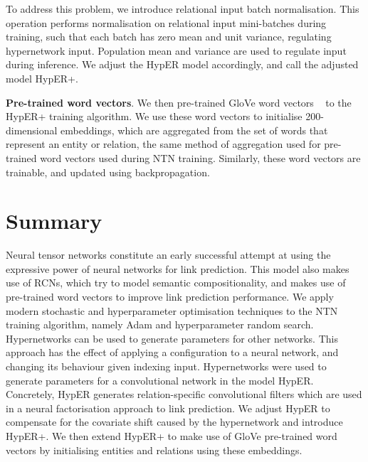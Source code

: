 \noindent To address this problem, we introduce relational input batch normalisation. This operation performs normalisation on relational input mini-batches during training, such that each batch has zero mean and unit variance, regulating hypernetwork input. Population mean and variance are used to regulate input during inference. We adjust the HypER model accordingly, and call the adjusted model HypER+. \par
 
\noindent \textbf{Pre-trained word vectors}. We then pre-trained GloVe word vectors \unskip ~\citep{pennington2014glove} to the HypER+ training algorithm. We use these word vectors to initialise  200-dimensional embeddings, which are aggregated from the set of words that represent an entity or relation, the same method of aggregation used for pre-trained word vectors used during NTN training. Similarly, these word vectors are trainable, and updated using backpropagation.  



\section{Summary}

Neural tensor networks constitute an early successful attempt at using the expressive power of neural networks for link prediction. This model also makes use of RCNs, which try to model semantic compositionality, and makes use of pre-trained word vectors to improve link prediction performance. We apply modern stochastic and hyperparameter optimisation techniques to the NTN training algorithm, namely Adam and hyperparameter random search. \newline
Hypernetworks can be used to generate parameters for other networks. This approach has the effect of applying a configuration to a neural network, and changing its behaviour given indexing input. Hypernetworks were used to generate parameters for a convolutional network in the model HypER. Concretely, HypER generates relation-specific convolutional filters which are used in a neural factorisation approach to link prediction. We adjust HypER to compensate for the covariate shift caused by the hypernetwork and introduce HypER+. We then extend HypER+ to make use of GloVe pre-trained word vectors by initialising entities and relations using these embeddings. \newline
